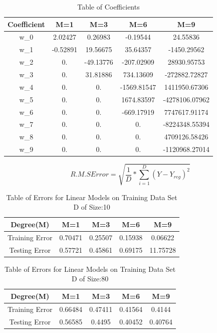 \documentclass[a4 paper]{article}
\begin{document}
\begin{table}[h!]
\centering
 \begin{tabular}{|c|c|c|c|c|} 
 \hline
 Coefficient & M=1 & M=3 & M=6 & M=9 \\ [0.5ex] 
 \hline
 w_{0} & 2.02427      &  0.26983    &   -0.19544 &       24.55836\\
 w_{1} &-0.52891      & 19.56675    &   35.64357 &   -1450.29562\\
 w_{2} & 0.           &-49.13776    & -207.02909 &   28930.95753\\
 w_{3} & 0.           & 31.81886    &  734.13609 & -272882.72827\\
 w_{4} & 0.           &  0.         &-1569.81547 & 1411950.67306\\
 w_{5} & 0.           &  0.         & 1674.83597 &-4278106.07962\\
 w_{6} & 0.           &  0.         & -669.17919 & 7747617.91174\\
 w_{7} & 0.           &  0.         &    0.      &-8224348.55394\\
 w_{8} & 0.           &  0.         &    0.      & 4709126.58426\\
 w_{9} & 0.           &  0.         &    0.      &-1120968.27014\\
\hline
\end{tabular}
\caption{Table of Coefficients}
\end{table}
\newpage
\begin{equation}
   R.M.S Error=\sqrt{\frac{1}{D}*\sum_{i=1}^{D}(Y-Y_{reg})^2}  
\end{equation}

\begin{table}[h!]
\centering
 \begin{tabular}{|c|c|c|c|c|} 
 \hline
Degree(M) & M=1 & M=3 & M=6 & M=9 \\ [0.5ex] 
\hline
Training Error & 0.70471 &0.25507 &0.15938 &0.06622\\
Testing Error  &  0.57721& 0.45861& 0.69175&11.75728\\
\hline
\end{tabular}
\caption{Table of Errors for Linear Models on Training Data Set D of Size:10}
\end{table}
\begin{table}[h!]
\centering
 \begin{tabular}{|c|c|c|c|c|} 
 \hline
Degree(M) & M=1 & M=3 & M=6 & M=9 \\ [0.5ex] 
\hline
Training Error & 0.66484 &0.47411 &0.41564 &0.4144\\
Testing Error  & 0.56585 &0.4495  &0.40452 &0.40764\\
\hline
\end{tabular}
\caption{Table of Errors for Linear Models on Training Data Set D of Size:80}
\end{table}
\end{document}
